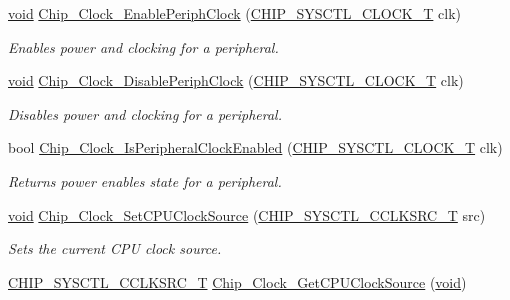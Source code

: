 \begin{DoxyCompactItemize}
\hyperlink{Paradigm_2Tern__EE_2small_2portmacro_8h_a14d32f8130d3c0b212cfc751730b5b49}{void} \hyperlink{group__CLOCK__17XX__40XX_gac63024a1f928ba359c4f4cac7e48fe39}{Chip\-\_\-\-Clock\-\_\-\-Enable\-Periph\-Clock} (\hyperlink{group__CLOCK__17XX__40XX_ga82e75cbe777e79f448fec3987ddd978e}{C\-H\-I\-P\-\_\-\-S\-Y\-S\-C\-T\-L\-\_\-\-C\-L\-O\-C\-K\-\_\-\-T} clk)
\begin{DoxyCompactList}\small\item\em Enables power and clocking for a peripheral. \end{DoxyCompactList}\item 
\hyperlink{Paradigm_2Tern__EE_2small_2portmacro_8h_a14d32f8130d3c0b212cfc751730b5b49}{void} \hyperlink{group__CLOCK__17XX__40XX_ga1bcb3f29f3cfbe896517e7bb6ebeaf03}{Chip\-\_\-\-Clock\-\_\-\-Disable\-Periph\-Clock} (\hyperlink{group__CLOCK__17XX__40XX_ga82e75cbe777e79f448fec3987ddd978e}{C\-H\-I\-P\-\_\-\-S\-Y\-S\-C\-T\-L\-\_\-\-C\-L\-O\-C\-K\-\_\-\-T} clk)
\begin{DoxyCompactList}\small\item\em Disables power and clocking for a peripheral. \end{DoxyCompactList}\item 
bool \hyperlink{group__CLOCK__17XX__40XX_ga0d7f762be4d4293d10d379fcc0b2388b}{Chip\-\_\-\-Clock\-\_\-\-Is\-Peripheral\-Clock\-Enabled} (\hyperlink{group__CLOCK__17XX__40XX_ga82e75cbe777e79f448fec3987ddd978e}{C\-H\-I\-P\-\_\-\-S\-Y\-S\-C\-T\-L\-\_\-\-C\-L\-O\-C\-K\-\_\-\-T} clk)
\begin{DoxyCompactList}\small\item\em Returns power enables state for a peripheral. \end{DoxyCompactList}\item 
\hyperlink{Paradigm_2Tern__EE_2small_2portmacro_8h_a14d32f8130d3c0b212cfc751730b5b49}{void} \hyperlink{group__CLOCK__17XX__40XX_gaefeafe3f6ad6d2690c252e6cfcc826dd}{Chip\-\_\-\-Clock\-\_\-\-Set\-C\-P\-U\-Clock\-Source} (\hyperlink{group__CLOCK__17XX__40XX_ga983f42d70f3939d1f1b46673e9e1f838}{C\-H\-I\-P\-\_\-\-S\-Y\-S\-C\-T\-L\-\_\-\-C\-C\-L\-K\-S\-R\-C\-\_\-\-T} src)
\begin{DoxyCompactList}\small\item\em Sets the current C\-P\-U clock source. \end{DoxyCompactList}\item 
\hyperlink{group__CLOCK__17XX__40XX_ga983f42d70f3939d1f1b46673e9e1f838}{C\-H\-I\-P\-\_\-\-S\-Y\-S\-C\-T\-L\-\_\-\-C\-C\-L\-K\-S\-R\-C\-\_\-\-T} \hyperlink{group__CLOCK__17XX__40XX_ga84a5acda2829b05c81326606630b7238}{Chip\-\_\-\-Clock\-\_\-\-Get\-C\-P\-U\-Clock\-Source} (\hyperlink{Paradigm_2Tern__EE_2small_2portmacro_8h_a14d32f8130d3c0b212cfc751730b5b49}{void})

\end{DoxyCompactItemize}
